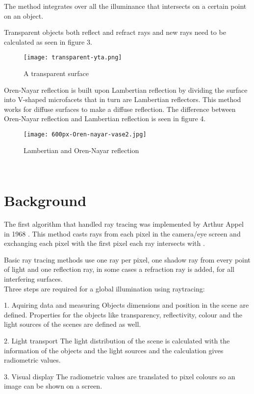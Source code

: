 \documentclass[a4paper,12pt]{IEEEtran}
\begin{document}
The method integrates over all the illuminance that intersects on a certain point on an object\cite{Path tracing}.

Transparent objects both reflect and refract rays and new rays need to be calculated as seen in figure 3.
\begin{figure}[h!]
\texttt{[image: transparent-yta.png]}
\caption{A transparent surface}
\end{figure}

Oren-Nayar reflection is built upon Lambertian reflection by dividing the surface into V-shaped microfacets that in turn are Lambertian reflectors. This method works for diffuse surfaces to make a diffuse reflection. The difference between Oren-Nayar reflection and Lambertian reflection is seen in figure 4.
\begin{figure}[h!]
\texttt{[image: 600px-Oren-nayar-vase2.jpg]}
\caption{Lambertian and Oren-Nayar reflection}
\end{figure}
\\
\section{Background}

The first algorithm that handled ray tracing was implemented by Arthur Appel in 1968 \cite{Arthur Appel}. This method casts rays from each pixel in the camera/eye screen and exchanging each pixel with the first pixel each ray intersects with \cite{Basic Raytracing}. 

Basic ray tracing methods use one ray per pixel, one shadow ray from every point of light and one reflection ray, in some cases a refraction ray is added, for all interfering surfaces.\\

Three steps are required for a global illumination using raytracing:

1. Aquiring data and measuring
	Objects dimensions and position in the scene are defined. Properties for the objects like transparency, reflectivity, colour and the light sources of the scenes are defined as well.
    
2. Light transport 
	The light distribution of the scene is calculated with the information of the objects and the light sources and the calculation gives radiometric values.
    
3. Visual display
	The radiometric values are translated to pixel colours so an image can be shown on a screen.
\\
\end{document}
